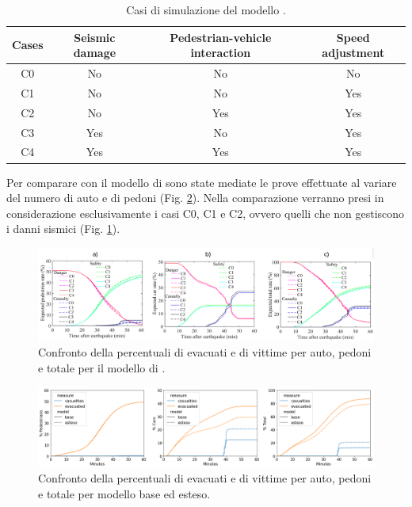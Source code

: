\begin{table}[ht]
    \centering
    \begin{tabular}{|c|c|c|c|}
        \hline
        Cases & Seismic damage & Pedestrian-vehicle interaction & Speed adjustment \\ \hline
        C0    & No             & No                             & No               \\ \hline
        C1    & No             & No                             & Yes              \\ \hline
        C2    & No             & Yes                            & Yes              \\ \hline
        C3    & Yes            & No                             & Yes              \\ \hline
        C4    & Yes            & Yes                            & Yes              \\ \hline
    \end{tabular}
    \caption{Casi di simulazione del modello \textcite{wang2021novel}.}
    \label{tab:cases}
\end{table}

Per comparare con il modello di \textcite{wang2021novel} sono state mediate le prove effettuate al variare del numero
di auto e di pedoni (Fig. \ref{fig:analisi-comparison-wang2}).
Nella comparazione verranno presi in considerazione esclusivamente i casi C0, C1 e C2, ovvero quelli
che non gestiscono i danni sismici (Fig. \ref{fig:analisi-comparison-wang1}).

\begin{figure}[ht]
    \centering
    \includegraphics[width=\textwidth]{images/analisi/WANG_comparison11.png}
    \caption{Confronto della percentuali di evacuati e di vittime per auto, pedoni e totale per il modello di \textcite{wang2021novel}.}
    \label{fig:analisi-comparison-wang1}
\end{figure}

\begin{figure}[ht]
    \centering
    \includegraphics[width=\textwidth]{images/analisi/WANG_comparison2.png}
    \caption{Confronto della percentuali di evacuati e di vittime per auto, pedoni e totale per modello base ed esteso.}
    \label{fig:analisi-comparison-wang2}
\end{figure}

